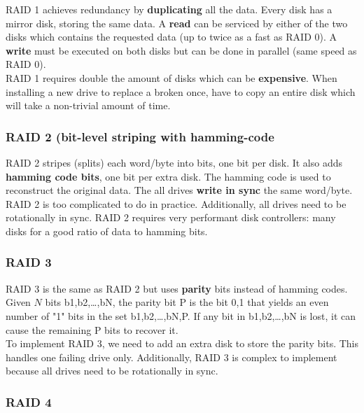 \documentclass{article}
\newcommand{\bold}[1]{\textbf{#1}}
\begin{document}
RAID 1 achieves redundancy by \bold{duplicating} all the data. Every disk has a mirror disk, storing the same data. A \bold{read} can be serviced by either of the two disks which contains the requested data (up to twice as a fast as RAID 0). A \bold{write} must be executed on both disks but can be done in parallel (same speed as RAID 0). \\ 

RAID 1 requires double the amount of disks which can be \bold{expensive}. When installing a new drive to replace a broken once, have to copy an entire disk which will take a non-trivial amount of time. 

\subsubsection{RAID 2 (bit-level striping with hamming-code}

RAID 2 stripes (splits) each word/byte into bits, one bit per disk. It also adds \bold{hamming code bits}, one bit per extra disk. The hamming code is used to reconstruct the original data. The all drives \bold{write in sync} the same word/byte. \\ 

RAID 2 is too complicated to do in practice. Additionally, all drives need to be rotationally in sync. RAID 2 requires very performant disk controllers: many disks for a good ratio of data to hamming bits. 


\subsubsection{RAID 3}

RAID 3 is the same as RAID 2 but uses \bold{parity} bits instead of hamming codes. Given $N$ bits {b1,b2,\dots,bN}, the parity bit P is the bit {0,1} that yields an even number of "1" bits in the set {b1,b2,\dots,bN,P}. If any bit in {b1,b2,\dots,bN} is lost, it can cause the remaining P bits to recover it. \\ 

To implement RAID 3, we need to add an extra disk to store the parity bits. This handles one failing drive only. Additionally, RAID 3 is complex to implement because all drives need to be rotationally in sync. 

\subsubsection{RAID 4}
\end{document}

